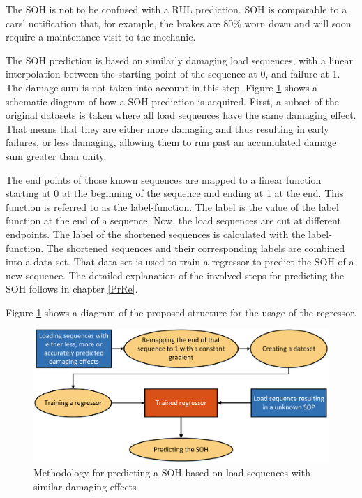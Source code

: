 The SOH is not to be confused with a RUL prediction. SOH is comparable to a cars' notification that, for example, the brakes are 80\% worn down and will soon require a maintenance visit to the mechanic. 

The SOH prediction is based on similarly damaging load sequences, with a linear interpolation between the starting point of the sequence at 0, and failure at 1. The damage sum is not taken into account in this step. 
Figure \ref{fig:GeneralMethod2} shows a schematic diagram of how a SOH prediction is acquired.
First, a subset of the original datasets is taken where all load sequences have the same damaging effect. That means that they are either more damaging and thus resulting in early failures, or less damaging, allowing them to run past an accumulated damage sum greater than unity.\newline

The end points of those known sequences are mapped to a linear function starting at 0 at the beginning of the sequence and ending at 1 at the end. This function is referred to as the label-function. The label is the value of the label function at the end of a sequence. Now, the load sequences are cut at different endpoints. The label of the shortened sequences is calculated with the label-function. The shortened sequences and their corresponding labels are combined into a data-set. That data-set is used to train a regressor to predict the SOH of a new sequence. The detailed explanation of the involved steps for predicting the SOH follows in chapter \ref{PrRe}.

Figure \ref{fig:GeneralMethod2} shows a diagram of the proposed structure for the usage of the regressor. 
 
\begin{figure}[H]
	\centering
	\includegraphics[width=1\linewidth]{IMGs/Method2.png}
	\caption{Methodology for predicting a SOH based on load sequences with similar damaging effects}
	\label{fig:GeneralMethod2}
\end{figure}


